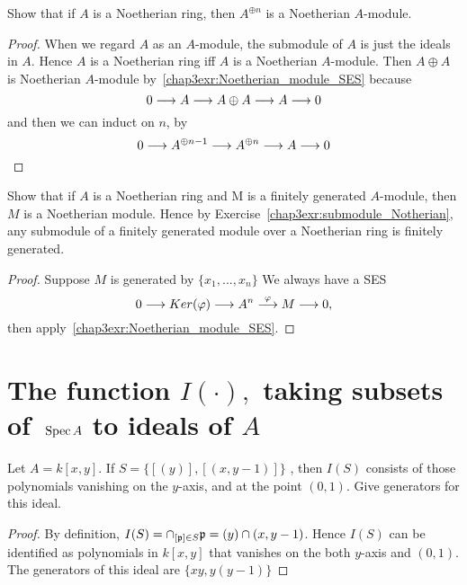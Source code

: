 \begin{exr}
Show that if $A$ is a Noetherian ring, then $A^{\oplus n}$ is a Noetherian
$A$-module.
\end{exr}
\begin{proof}
When we regard $A$ as an $A$-module, the submodule of $A$ is just the ideals in $A$. Hence $A$ is a Noetherian ring iff $A$ is a Noetherian $A$-module. Then $A\oplus A$ is Noetherian $A$-module by~\ref{chap3exr:Noetherian_module_SES} because
$$
0\longrightarrow A\longrightarrow A\oplus A\longrightarrow A\longrightarrow 0
$$
and then we can induct on $n$, by 
$$
0\longrightarrow A^{\oplus{n-1}}\longrightarrow A^{\oplus n}\longrightarrow A\longrightarrow 0
$$
\end{proof}

\begin{exr}
Show that if $A$ is a Noetherian ring and M is a finitely generated $A$-module, then $M$ is a Noetherian module. Hence by Exercise~\ref{chap3exr:submodule_Notherian}, any submodule of a finitely generated module over a Noetherian ring is finitely generated.
\end{exr}
\begin{proof}
Suppose $M$ is generated by $\{x_1,...,x_n\}$
We always have a SES
$$
0\longrightarrow Ker(\varphi)\longrightarrow {A}^n\overset{\varphi}{\longrightarrow} M\longrightarrow 0,
$$
then apply~\ref{chap3exr:Noetherian_module_SES}.
\end{proof}
\section{The function $I(\cdot),$ taking subsets of $\text{ Spec\,} A$ to ideals of $A$}

\begin{exr}
Let $A = k[x, y]$. If $S = \{[(y)], [(x, y - 1)]\} $ , then $I(S)$ consists of those polynomials vanishing on the $y$-axis, and at the point $(0, 1)$. Give generators for this ideal.
\end{exr}
\begin{proof}
By definition, $I(S)=\cap_{[{\mathfrak p}]\in S}{\mathfrak p}= (y)\cap (x,y-1)$. Hence $I(S)$ can be identified as polynomials in $k[x,y]$ that vanishes on the both $y$-axis and $(0,1)$. The generators of this ideal are $\{xy,y(y-1)\}$
\end{proof}

